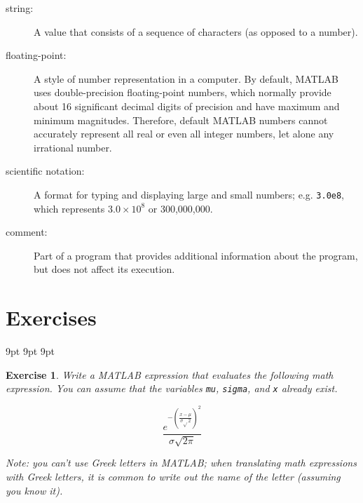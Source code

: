 \documentclass[
]{book}
\begin{document}
\begin{description}
\item[string:] A value that consists of a sequence of characters (as
opposed to a number).

\item[floating-point:] A style of number representation in a computer.  
By default, MATLAB uses 
double-precision
floating-point numbers, which normally provide about 16 significant
decimal digits of precision and have maximum and minimum magnitudes.
Therefore, default MATLAB numbers cannot accurately represent all real
or even all integer numbers, let alone any irrational number.

\item[scientific notation:] A format for typing and displaying large
and small numbers; e.g. {\tt 3.0e8}, which represents $3.0 \times 10^8$
or 300,000,000.

\item[comment:] Part of a program that provides additional information
about the program, but does not affect its execution.

\end{description}


\section{Exercises}

     {9pt}%
     {9pt}%
     {\itshape}%
     {}%
     {\bfseries}%
     {}%
     {9pt}%
     {}%


\theoremstyle{myex}
\newtheorem{ex}{Exercise}[chapter]

\begin{ex}
Write a MATLAB expression that evaluates the
following math expression.  You can assume that the variables
{\tt mu}, {\tt sigma}, and {\tt x} already exist.

\begin{equation}
\frac{e^{- \left( \frac{x-\mu}{\sigma \sqrt{}2} \right) ^2}}
{\sigma \sqrt{2 \pi}}
\end{equation}

Note: you can't use Greek letters in MATLAB; when translating
math expressions with Greek letters, it is common to write out
the name of the letter (assuming you know it).
\end{ex}
\end{document}
